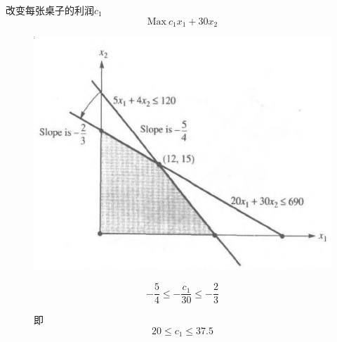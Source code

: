 \documentclass[UTF8]{ctexbeamer}
\begin{document}
\begin{frame}{改变每张桌子的利润$c_1$}
  \[
  \mbox{Max}\ c_1x_1 + 30x_2
  \]

  \begin{figure}
    \begin{minipage}{.5\linewidth}
      \includegraphics[width=\textwidth{}]{table.png}
    \end{minipage}%
    \begin{minipage}{.5\linewidth}
      \[
      -\frac{5}{4} \le -\frac{c_1}{30} \le -\frac{2}{3}
      \]

      即
      \[
      20 \le c_1 \le 37.5
      \]

    \end{minipage}
  \end{figure}  

\end{frame}
\end{document}
